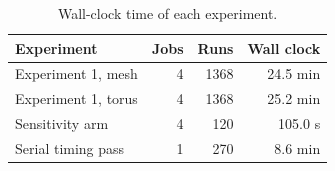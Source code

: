 \begin{table}[H]
\centering\small
\begin{tabular}{@{}lrrr@{}}
\toprule
Experiment & Jobs & Runs & Wall clock \\
\midrule
Experiment 1, mesh & 4 & 1368 & 24.5 min \\
Experiment 1, torus & 4 & 1368 & 25.2 min \\
Sensitivity arm & 4 & 120 & 105.0 s \\
Serial timing pass & 1 & 270 & 8.6 min \\
\bottomrule
\end{tabular}
\caption{Wall-clock time of each experiment.}
\label{tab:runtimes-total}
\end{table}
